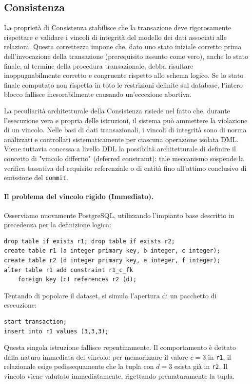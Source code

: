 \subsection{Consistenza}

La proprietà di Consistenza stabilisce che la transazione deve rigorosamente rispettare e validare i vincoli di integrità del modello dei dati associati alle relazioni. Questa correttezza impone che, dato uno stato iniziale corretto prima dell'invocazione della transazione (prerequisito assunto come vero), anche lo stato finale, al termine della procedura transazionale, debba risultare inoppugnabilmente corretto e congruente rispetto allo schema logico. Se lo stato finale computato non rispetta in toto le restrizioni definite sul database, l'intero blocco fallisce inesorabilmente causando un'eccezione abortiva.

La peculiarità architetturale della Consistenza risiede nel fatto che, durante l'esecuzione vera e propria delle istruzioni, il sistema può ammettere la violazione di un vincolo. Nelle basi di dati transazionali, i vincoli di integrità sono di norma analizzati e controllati sistematicamente per ciascuna operazione isolata DML. Viene tuttavia concessa a livello DDL la possibiltà architetturale di definire il concetto di "vincolo differito" (deferred constraint): tale meccanismo sospende la verifica tassativa del requisito referenziale o di entità fino all'attimo conclusivo di emissione del \texttt{commit}.

\paragraph{Il problema del vincolo rigido (Immediato).}
Osserviamo nuovamente PostgreSQL, utilizzando l'impianto base descritto in precedenza per la definizione logica:

\begin{verbatim}
drop table if exists r1; drop table if exists r2;
create table r1 (a integer primary key, b integer, c integer);
create table r2 (d integer primary key, e integer, f integer);
alter table r1 add constraint r1_c_fk
    foreign key (c) references r2 (d);
\end{verbatim}

Tentando di popolare il dataset, si simula l'apertura di un pacchetto di esecuzione:
\begin{verbatim}
start transaction;
insert into r1 values (3,3,3);
\end{verbatim}
Questa singola istruzione fallisce repentinamente. Il comportamento è dettato dalla natura immediata del vincolo: per memorizzare il valore $c=3$ in \texttt{r1}, il relazionale esige pedissequamente che la tupla con $d=3$ esista già in \texttt{r2}. Il vincolo viene valutato immediatamente, rigettando prematuramente la tupla.

